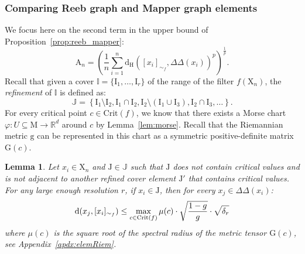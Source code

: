 \documentclass[pdflatex,sn-mathphys-ay]{sn-jnl}%
\newtheorem{lemma}[theorem]{Lemma}
\newcommand{\man}{\mathrm{M}}
\newcommand{\sample}{\mathrm{X}}
\newcommand{\dis}{\mathrm{d}}
\newcommand{\critic}{{\mathrm {Crit}}}
\newcommand{\appr}{{\mathrm {A}}}
\newcommand{\haus}{{\mathrm {d_H}}}
\newcommand{\interv}{{\mathrm {I}}}
\newcommand{\DD}{\Delta\!\!\!\!\Delta}
\newcommand{\coverwidth}{\change{\delta_r}}
\newcommand{\g}{\mathrm{g}}
\newcommand{\G}{\mathrm{G}}
\newcommand{\R}{\mathbb{R}}
\newcommand{\change}[1]{\noindent #1}
\theoremstyle{thmstyleone}%
\begin{document}
 \subsubsection{Comparing Reeb graph and Mapper graph elements}
We focus here on the second term in the upper bound of Proposition~\ref{prop:reeb_mapper}:
$$\appr_n=\left(\frac{1}{n}\sum_{i=1}^n\haus([x_i]_{\sim_f},\DD(x_i))^p\right)^{\frac{1}{p}}.$$
Recall that given a cover $\mathbb{I}=\{\interv_1,\dots,\interv_r\}$ of the range of the filter $f(\sample_n)$, the {\em refinement} of $\mathbb{I}$ is defined as:
$$\mathbb{J}=\left\{\interv_1\setminus\interv_2,\interv_1\cap\interv_2,\interv_2\setminus(\interv_1\cup\interv_3),\interv_2\cap\interv_3,\dots\right\}.$$
For every critical point $c\in\critic(f)$, we know that there exists a Morse chart $\varphi\colon U\subseteq\man\rightarrow\R^d$ around $c$ by Lemma~\ref{lem:morse}. Recall that the Riemannian metric $\g$ can be represented in this chart as a symmetric positive-definite matrix $\G(c)$.

\begin{lemma}\label{lem:delta}
Let $x_i\in\sample_n$ and $\mathrm{J}\in\mathbb{J}$ such that $\mathrm{J}$ does not contain critical values and is not adjacent to another refined cover element $\mathrm{J}'$ that contains critical values. For any large enough resolution $r$, if $x_i\in\mathrm{J}$, then for every $x_j\in\DD(x_i)$:
$$\dis(x_j,[x_i]_{\sim_f})\leq\max_{c\in\critic(f)}\mu(c)\cdot\sqrt{\frac{1-g}{g}}\cdot\sqrt{\coverwidth}$$
where $\mu(c)$ is the square root of the spectral radius of the metric tensor $\G(c)$, see Appendix~\ref{apdx:elemRiem}.
\end{lemma}
\end{document}
